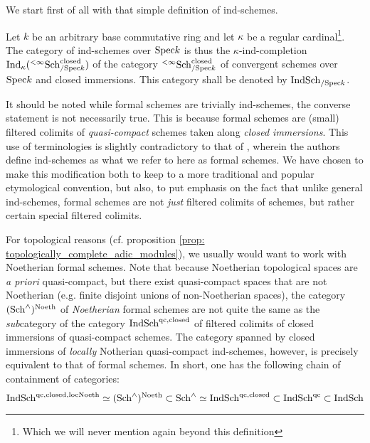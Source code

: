             We start first of all with that simple definition of ind-schemes.
            \begin{definition} \label{def: ind-schemes}
                Let $k$ be an arbitrary base commutative ring and let $\kappa$ be a regular cardinal\footnote{Which we will never mention again beyond this definition}. The category of ind-schemes over $\mathrm{Spec} k$ is thus the $\kappa$-ind-completion $\mathrm{Ind}_{\kappa}({}^{< \infty}\mathrm{Sch}_{/\mathrm{Spec} k}^{\mathrm{closed}})$ of the category ${}^{< \infty}\mathrm{Sch}_{/\mathrm{Spec} k}^{\mathrm{closed}}$ of convergent schemes over $\mathrm{Spec} k$ and closed immersions. This category shall be denoted by $\mathrm{Ind}\mathrm{Sch}_{/\mathrm{Spec} k}$.
            \end{definition}
            \begin{remark} \label{remark: ind_schemes_vs_formal_schemes}
                It should be noted while formal schemes are trivially ind-schemes, the converse statement is not necessarily true. This is because formal schemes are (small) filtered colimits of \textit{quasi-compact} schemes taken along \textit{closed immersions}. This use of terminologies is slightly contradictory to that of \cite[Definition I.2.1.1.2]{GR2}, wherein the authors define ind-schemes as what we refer to here as formal schemes. We have chosen to make this modification both to keep to a more traditional and popular etymological convention, but also, to put emphasis on the fact that unlike general ind-schemes, formal schemes are not \textit{just} filtered colimits of schemes, but rather certain special filtered colimits.
                
                For topological reasons (cf. proposition \ref{prop: topologically_complete_adic_modules}), we usually would want to work with Noetherian formal schemes. Note that because Noetherian topological spaces are \textit{a priori} quasi-compact, but there exist quasi-compact spaces that are not Noetherian (e.g. finite disjoint unions of non-Noetherian spaces), the category $(\mathrm{Sch}^{\wedge})^{\mathrm{Noeth}}$ of \textit{Noetherian} formal schemes are not quite the same as the \textit{sub}category of the category $\mathrm{Ind}\mathrm{Sch}^{\mathrm{qc}, \mathrm{closed}}$ of filtered colimits of closed immersions of quasi-compact schemes. The category spanned by closed immersions of \textit{locally} Notherian quasi-compact ind-schemes, however, is precisely equivalent to that of formal schemes. In short, one has the following chain of containment of categories:
                    $$\mathrm{Ind}\mathrm{Sch}^{\mathrm{qc}, \mathrm{closed}, \mathrm{loc}\mathrm{Noeth}} \simeq (\mathrm{Sch}^{\wedge})^{\mathrm{Noeth}} \subset \mathrm{Sch}^{\wedge} \simeq \mathrm{Ind}\mathrm{Sch}^{\mathrm{qc}, \mathrm{closed}} \subset \mathrm{Ind}\mathrm{Sch}^{\mathrm{qc}} \subset \mathrm{Ind}\mathrm{Sch}$$
            \end{remark}
